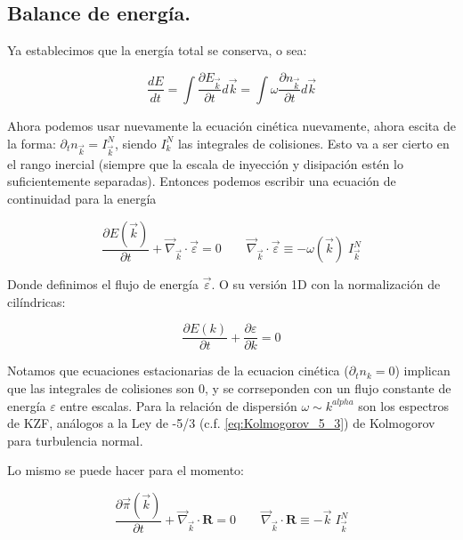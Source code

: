 \subsection*{Balance de energía.}
Ya establecimos que la energía total se conserva, o sea:

\begin{equation}
	\frac{dE}{dt} = \int \frac{\partial E_{\vec k}}{\partial t} d\vec k =\int \omega \frac{\partial n_{\vec k}}{\partial t} d\vec k  
\end{equation}

Ahora podemos usar nuevamente la ecuación cinética nuevamente, ahora escita de la forma: $\partial_t n_{\vec k} = I_{\vec k}^N$, siendo $I_k^N$ las integrales de colisiones. Esto va a ser cierto en el rango inercial (siempre que la escala de inyección y disipación estén lo suficientemente separadas). Entonces podemos escribir una ecuación de continuidad para la energía

 
\begin{equation}
	\frac{\partial E(\vec k)}{\partial t} + \vec\nabla_{\vec k} \cdot \vec \varepsilon = 0  \qquad \vec\nabla_{\vec k} \cdot \vec \varepsilon \equiv - \omega(\vec k)\;I_{\vec k}^N
	\label{eq:energy_balance}
\end{equation}


Donde definimos el flujo de energía $\vec \varepsilon$. O su versión 1D con la normalización de cilíndricas:

\begin{equation}
	\frac{\partial E(k)}{\partial t} + \frac{\partial \varepsilon}{\partial k} = 0
\end{equation}

Notamos que ecuaciones estacionarias de la ecuacion cinética ($\partial_tn_k = 0$) implican que las integrales de colisiones son 0, y se corrseponden con un flujo constante de energía $\varepsilon$ entre escalas. Para la relación de dispersión $\omega\sim k^{alpha}$ son los espectros de KZF, análogos a la Ley de -5/3 (c.f. \eqref{eq:Kolmogorov_5_3}) de Kolmogorov para turbulencia normal.

Lo mismo se puede hacer para el momento:

\begin{equation}
	\frac{\partial\vec \pi(\vec k)}{\partial t} + \vec\nabla_{\vec k} \cdot  \mathbf{R} = 0  \qquad \vec\nabla_{\vec k} \cdot  \mathbf{R} \equiv - \vec k\;I_{\vec k}^N 
\end{equation}

